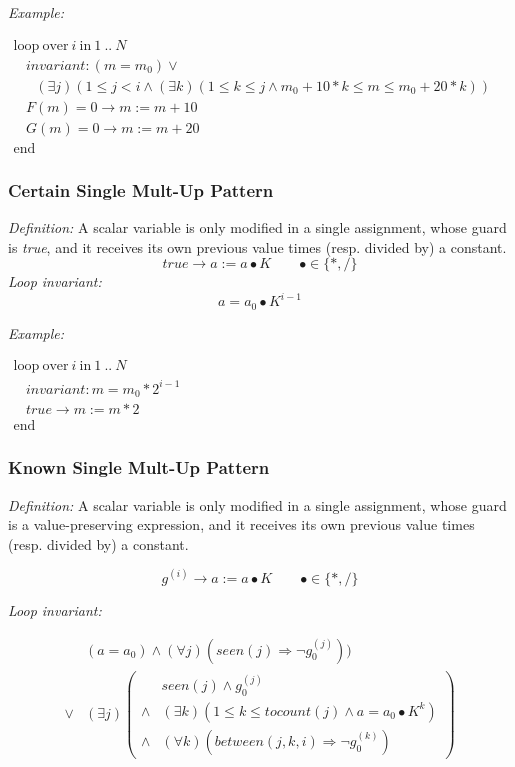 \documentclass[a4paper,10pt]{article}
\newcommand{\idx}{\ensuremath{i}\xspace}
\newcommand{\at}[1]{{(#1)}}
\newcommand{\KWloop}{\ensuremath{\mathrm{loop}~}}
\newcommand{\KWend}{\ensuremath{\mathrm{end}~}}
\newcommand{\KWover}{\ensuremath{\mathrm{over}~}}
\newcommand{\KWin}{\ensuremath{~\mathrm{in}~}}
\newcommand{\impl}{\ensuremath{\Longrightarrow}}
\newcommand{\seen}[1]{\ensuremath{\mathit{seen}(#1)}\xspace}
\newcommand{\tocount}[1]{\ensuremath{\mathit{tocount}(#1)}\xspace}
\newcommand{\between}[3]{\ensuremath{\mathit{between}{(#1,#2,#3)}}\xspace}
\newcommand{\loopinvariant}{\noindent\textit{Loop invariant:}\xspace}
\newcommand{\patterndef}{\noindent\textit{Definition:}\xspace}
\newcommand{\patternexample}{\noindent\textit{Example:}\xspace}
\begin{document}
\bigskip
\patternexample

\medskip
$\begin{array}{l}
  \KWloop \KWover i \KWin 1~..~N \\
  ~~~~ \textit{invariant}: (m = m_0) \lor \\
  ~~~~~~~ (\exists j)(1 \leq j < i \land (\exists k)(1 \leq k \leq j \land m_0+10*k \leq m \leq m_0 +20*k))\\
  ~~~~ F(m)=0 \rightarrow m := m+10\\
  ~~~~ G(m)=0 \rightarrow m := m+20\\
  \KWend
\end{array}$

\subsubsection*{Certain Single Mult-Up Pattern}

\patterndef A scalar variable is only modified in a single assignment, whose
guard is \textit{true}, and it receives its own previous value times
(resp. divided by) a constant.
%
$$\mathit{true} \rightarrow a := a \bullet K \qquad \bullet \in \{*, / \}$$
%
\loopinvariant
%
$$a = a_0 \bullet K^{i-1}$$

\bigskip
\patternexample

\medskip
$\begin{array}{l}
  \KWloop \KWover i \KWin 1~..~N \\
  ~~~~ \textit{invariant}: m = m_0 * 2^{i-1}\\
  ~~~~ true \rightarrow m := m*2\\
  \KWend
\end{array}$

\subsubsection*{Known Single Mult-Up Pattern}

\patterndef A scalar variable is only modified in a single assignment, whose
guard is a value-preserving expression, and it receives its own previous value times
(resp. divided by) a constant.

$$g^\at{\idx} \rightarrow a := a \bullet K  \qquad \bullet \in \{*, / \}$$

\loopinvariant

\begin{eqnarray*}
&(a = a_0) \land (\forall j)(\seen{j} \impl \neg g_0^\at{j})) \\
\lor 
& (\exists j)
\left(\begin{array}{cl}
& \seen{j} \land g_0^\at{j} \\
\land& (\exists k)(1 \leq k \leq \tocount{j} \land a = a_0 \bullet K^k)\\
\land& (\forall k)(\between{j}{k}{\idx} \impl \neg g_0^\at{k})
\end{array}\right)
\end{eqnarray*}
\end{document}
